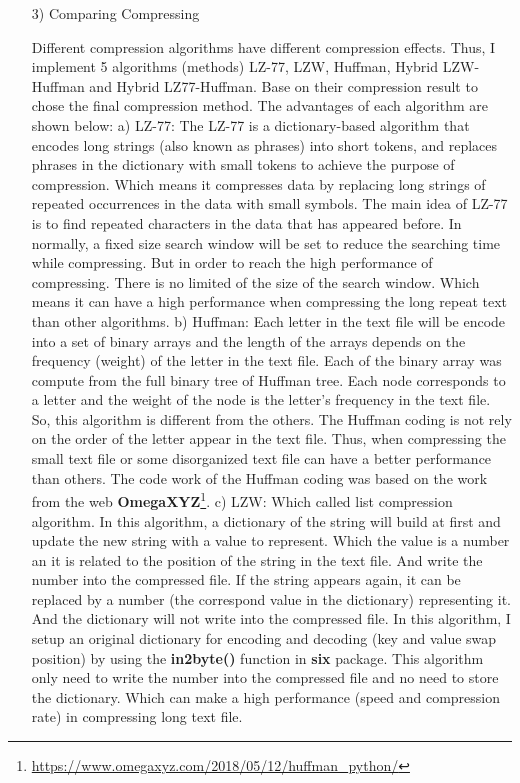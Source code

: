 \documentclass[margin 2cm]{report}
\begin{document}
\begin{enumerate}
\normalsize\item[3)]{Comparing Compressing}
\begin{spacing}{1.5}
\normalsize\indent\setlength{\parindent}{2em}Different compression algorithms have different compression effects. Thus, I implement 5 algorithms (methods) LZ-77, LZW, Huffman, Hybrid LZW-Huffman and Hybrid LZ77-Huffman. Base on their compression result to chose the final compression method. The advantages of each algorithm are shown below:
\newline\normalsize a) LZ-77:   The LZ-77 is a dictionary-based algorithm that encodes long strings (also known as phrases) into short tokens, and replaces phrases in the dictionary with small tokens to achieve the purpose of compression. Which means it compresses data by replacing long strings of repeated occurrences in the data with small symbols. The main idea of LZ-77 is to find repeated characters in the data that has appeared before. In normally, a fixed size search window will be set to reduce the searching time while compressing. But in order to reach the high performance of compressing. There is no limited of the size of the search window. Which means it can have a high performance when compressing the long repeat text than other algorithms.
\newline\normalsize b) Huffman:   Each letter in the text file will be encode into a set of binary arrays and the length of the arrays depends on the frequency (weight) of the  letter in the text file. Each of the binary array was compute from the full binary tree of Huffman tree. Each node corresponds to a letter and the weight of the node is the letter's frequency in the text file. So, this algorithm is different from the others. The Huffman coding is not rely on the order of the letter appear in the text file. Thus, when compressing the small text file or some disorganized text file can have a better performance than others. The code work of the Huffman coding was based on the work from the web \textbf{OmegaXYZ}\footnote[1]{\url{https://www.omegaxyz.com/2018/05/12/huffman_python/}}.
\newline\normalsize c) LZW:   Which called list compression algorithm. In this algorithm, a dictionary of the string will build at first and update the new string with a value to represent. Which the value is a number an it is related to the position of the string in the text file. And write the number into the compressed file. If the string appears again, it can be replaced by a number (the correspond value in the dictionary) representing it. And the dictionary will not write into the compressed file. In this algorithm, I setup an original dictionary for encoding and decoding (key and value swap position) by using the \textbf{in2byte()} function in \textbf{six} package. This algorithm only need to write the number into the compressed file and no need to store the dictionary. Which can make a high performance (speed and compression rate) in compressing long text file.

\end{spacing}
\end{enumerate}
\end{document}
